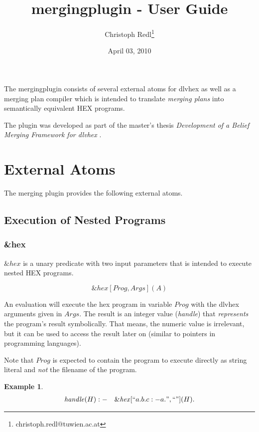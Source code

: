 \documentclass[a4paper,11pt]{article}
\theoremstyle{definition}
\newtheorem{example}{Example}
\newenvironment{mathprogram}[1][P]
	{
		\renewcommand{\ruleimplication}{&:-&}
		\newcommand{\ruledelimiter}{1}
		\begin{eqnarray*}
	}
	{
		\end{eqnarray*}
	}
\newcommand{\ruleimplication}{\ensuremath{\mathit{:-}}}
\newcommand{\hex}{\textsf{HEX}\xspace }
\newcommand{\dlvhex}{\textsf{dlvhex}\xspace }
\begin{document}
	\title{mergingplugin - User Guide}
	\date{April 03, 2010}
	\author{Christoph Redl\footnote{christoph.redl@tuwien.ac.at}}
	\maketitle

	The mergingplugin consists of several external atoms for \dlvhex as well as a merging plan compiler which is intended to translate \emph{merging plans} into semantically equivalent
	\hex programs.
	
	The plugin was developed as part of the master's thesis \emph{Development of a Belief Merging Framework for \dlvhex} \cite{CR10BMF}.

	
	\section{External Atoms}
	\label{sec:ExternalAtoms}

	The merging plugin provides the following external atoms.


		\subsection{Execution of Nested Programs}
		\label{sec:ExternalAtoms:Execution}


			\subsubsection{\&hex}

				$\mathit{\&hex}$ is a unary predicate with two input parameters that is intended to execute nested \hex programs.
			
					$$\mathit{\&hex}[\mathit{Prog}, \mathit{Args}](A)$$

				An evaluation will execute the hex program in variable $\mathit{Prog}$ with the \dlvhex arguments given in $\mathit{Args}$. The result is an integer value (\emph{handle})
				that \emph{represents} the program's result symbolically. That means, the numeric value is irrelevant, but it can be used to access the result later on (similar to
				pointers in programming languages).
				
				Note that $\mathit{Prog}$ is expected to contain the program to execute directly as string literal and \emph{not} the filename of the program.
				
				\begin{example}
					\label{ex:Calling1}
					\begin{mathprogram}
\mathit{handle}(H) \ruleimplication \mathit{\&hex}[``a. b. c :- a.", ``"](H).
					\end{mathprogram}
				\end{example}
\end{document}
